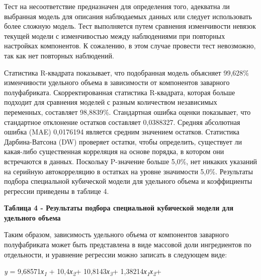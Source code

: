 Тест на несоответствие предназначен для определения того, адекватна ли
выбранная модель для описания наблюдаемых данных или следует
использовать более сложную модель. Тест выполняется путем сравнения
изменчивости невязок текущей модели с изменчивостью между наблюдениями
при повторных настройках компонентов. К сожалению, в этом случае
провести тест невозможно, так как нет повторных наблюдений.

Статистика R-квадрата показывает, что подобранная модель объясняет
99,628\% изменчивости удельного объема в зависимости от компонентов
заварного полуфабриката. Скорректированная статистика R-квадрата,
которая больше подходит для сравнения моделей с разным количеством
независимых переменных, составляет 98,8839\%. Стандартная ошибка оценки
показывает, что стандартное отклонение остатков составляет 0,0388327.
Средняя абсолютная ошибка (MAE) 0,0176194 является средним значением
остатков. Статистика Дарбина-Ватсона (DW) проверяет остатки, чтобы
определить, существует ли какая-либо существенная корреляция на основе
порядка, в котором они встречаются в данных. Поскольку P-значение больше
5,0\%, нет никаких указаний на серийную автокорреляцию в остатках на
уровне значимости 5,0\%. Результаты подбора специальной кубической
модели для удельного объема и коэффициенты регрессии приведены в таблице
4.

{\bfseries Таблица 4 - Результаты подбора специальной кубической модели для
удельного объема}


Таким образом, зависимость удельного объема от компонентов заварного
полуфабриката может быть представлена в виде массовой доли ингредиентов
по отдельности, и уравнение регрессии можно записать в следующем виде:

\emph{y} = 9,68571\emph{х\textsubscript{1 }}+
10,4\emph{х\textsubscript{2}}+ 10,8143\emph{х\textsubscript{3}}+
1,38214\emph{х\textsubscript{1}х\textsubscript{2}}+

